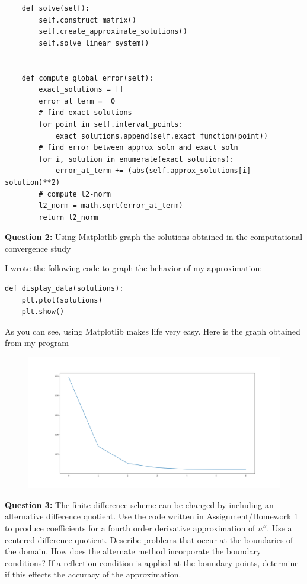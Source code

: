 \documentclass[10pt]{article}
\newcommand{\1}{\mathbb{1}}
\begin{document}
\begin{verbatim}
    def solve(self):
        self.construct_matrix()
        self.create_approximate_solutions()
        self.solve_linear_system()


    def compute_global_error(self):   
        exact_solutions = []
        error_at_term =  0
        # find exact solutions
        for point in self.interval_points:
            exact_solutions.append(self.exact_function(point))
        # find error between approx soln and exact soln
        for i, solution in enumerate(exact_solutions):
            error_at_term += (abs(self.approx_solutions[i] - solution)**2)
        # compute l2-norm
        l2_norm = math.sqrt(error_at_term)
        return l2_norm
\end{verbatim}
\newpage
\textbf{Question 2:} Using Matplotlib graph the solutions obtained in the computational convergence study

I wrote the following code to graph the behavior of my approximation:
\begin{verbatim}
def display_data(solutions):
    plt.plot(solutions)
    plt.show()
\end{verbatim}
As you can see, using Matplotlib makes life very easy. Here is the graph obtained from my program

\begin{figure}[h!]
    \centering
    \includegraphics[scale=0.3]{Figure_1.png}
\end{figure}

\textbf{Question 3:} The finite difference scheme can be changed by including an alternative difference quotient. Use the code written in Assignment/Homework 1 to produce coefficients for a fourth order derivative approximation of $u''$. Use a centered difference quotient. Describe problems that occur at the boundaries of the domain. How does the alternate method incorporate the boundary conditions? If a reflection condition is applied at the boundary points, determine if this effects the accuracy of the approximation.\\
\end{document}
